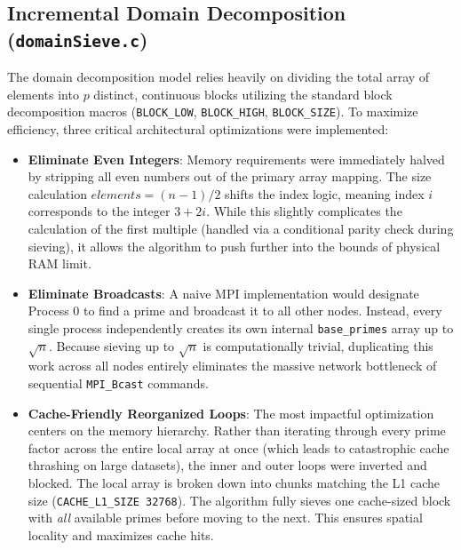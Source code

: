 \documentclass[11pt]{article}
\begin{document}
\subsection{Incremental Domain Decomposition (\texttt{domainSieve.c})}
The domain decomposition model relies heavily on dividing the total array of elements into $p$ distinct, continuous blocks utilizing the standard block decomposition macros (\texttt{BLOCK\_LOW}, \texttt{BLOCK\_HIGH}, \texttt{BLOCK\_SIZE}). To maximize efficiency, three critical architectural optimizations were implemented:
\begin{itemize}
  \item \textbf{Eliminate Even Integers}: Memory requirements were immediately halved by stripping all even numbers out of the primary array mapping. The size calculation $elements = (n - 1) / 2$ shifts the index logic, meaning index $i$ corresponds to the integer $3 + 2i$. While this slightly complicates the calculation of the first multiple (handled via a conditional parity check during sieving), it allows the algorithm to push further into the bounds of physical RAM limit.
  \item \textbf{Eliminate Broadcasts}: A naive MPI implementation would designate Process 0 to find a prime and broadcast it to all other nodes. Instead, every single process independently creates its own internal \texttt{base\_primes} array up to $\sqrt{n}$. Because sieving up to $\sqrt{n}$ is computationally trivial, duplicating this work across all nodes entirely eliminates the massive network bottleneck of sequential \texttt{MPI\_Bcast} commands.
  \item \textbf{Cache-Friendly Reorganized Loops}: The most impactful optimization centers on the memory hierarchy. Rather than iterating through every prime factor across the entire local array at once (which leads to catastrophic cache thrashing on large datasets), the inner and outer loops were inverted and blocked. The local array is broken down into chunks matching the L1 cache size (\texttt{CACHE\_L1\_SIZE 32768}). The algorithm fully sieves one cache-sized block with \textit{all} available primes before moving to the next. This ensures spatial locality and maximizes cache hits.
\end{itemize}
\end{document}
